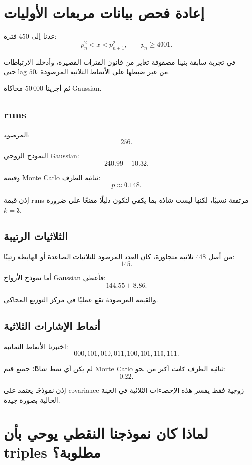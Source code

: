 \documentclass[12pt]{article}
\begin{document}
\section{إعادة فحص بيانات مربعات الأوليات}

عدنا إلى \(450\) فترة:
\[
p_n^2<x<p_{n+1}^2,
\qquad p_n\ge4001.
\]

في تجربة سابقة بنينا مصفوفة تغاير من قانون الفترات القصيرة، وأدخلنا
الارتباطات حتى lag \(50\)، من غير ضبطها على الأنماط الثلاثية المرصودة.

ثم أجرينا \(50\,000\) محاكاة Gaussian.

\subsection{runs}

المرصود:
\[
256.
\]

النموذج الزوجي Gaussian:
\[
240.99\pm10.32.
\]

وقيمة Monte Carlo ثنائية الطرف:
\[
p\approx0.148.
\]

إذن قيمة runs مرتفعة نسبيًا، لكنها ليست شاذة بما يكفي لتكون دليلًا
مقنعًا على ضرورة \(k=3\).

\subsection{الثلاثيات الرتيبة}

من أصل \(448\) ثلاثية متجاورة، كان العدد المرصود للثلاثيات الصاعدة أو
الهابطة رتيبًا:
\[
145.
\]

أما نموذج الأزواج Gaussian فأعطى:
\[
144.55\pm8.86.
\]

والقيمة المرصودة تقع عمليًا في مركز التوزيع المحاكى.

\subsection{أنماط الإشارات الثلاثية}

اختبرنا الأنماط الثمانية:
\[
000,001,010,011,100,101,110,111.
\]

لم يكن أي نمط شاذًا؛ جميع قيم Monte Carlo ثنائية الطرف كانت أكبر من
نحو:
\[
0.22.
\]

إذن نموذجًا يعتمد على covariance زوجية فقط يفسر هذه الإحصاءات الثلاثية
في العينة الحالية بصورة جيدة.

\section{لماذا كان نموذجنا النقطي يوحي بأن triples مطلوبة؟}
\end{document}
